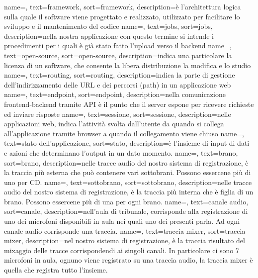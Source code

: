 {
  name=,
  text=framework,
  sort=framework,
  description={è l'architettura logica sulla quale il software viene progettato e realizzato, utilizzato per facilitare lo sviluppo e il mantenimento del codice}
}
{
  name=,
  text=jobs,
  sort=jobs,
  description={nella nostra applicazione con questo termine si intende i procedimenti per i quali è già stato fatto l'upload verso il backend}
}
{
  name=,
  text=open-source,
  sort=open-source,
  description={indica una particolare la licenza di un software, che consente la libera distribuzione la modifica e lo studio}
}
{
  name=,
  text=routing,
  sort=routing,
  description={indica la parte di gestione dell'indirizzamento delle URL e dei percorsi (path) in un applicazione web}
}
{
  name=,
  text=endpoint,
  sort=endpoint,
  description={nella comunicazione frontend-backend tramite API è il punto che il server espone per ricevere richieste ed inviare risposte}
}
{
  name=,
  text=sessione,
  sort=sessione,
  description={nelle applicazioni web, indica l'attività svolta dall'utente da quando si collega all'applicazione tramite browser a quando il collegamento viene chiuso}
}
{
  name=,
  text=stato dell'applicazione,
  sort=stato,
  description={è l'insieme di input di dati e azioni che determinano l'output in un dato momento.}
}
{
  name=,
  text=brano,
  sort=brano,
  description={nelle tracce audio del nostro sistema di registrazione, è la traccia più esterna che può contenere vari sottobrani. Possono essercene più di uno per CD.}
}
{
  name=,
  text=sottobrano,
  sort=sottobrano,
  description={nelle tracce audio del nostro sistema di registrazione, è la traccia più interna che è figlia di un brano. Possono essercene più di una per ogni brano.}
}
{
  name=,
  text=canale audio,
  sort=canale,
  description={nell'aula di tribunale, corrisponde alla registrazione di uno dei microfoni disponibili in aula nei quali uno dei presenti parla. Ad ogni canale audio corrisponde
      una traccia.}
}
{
  name=,
  text=traccia mixer,
  sort=traccia mixer,
  description={nel nostro sistema di registrazione, è la traccia risultato del mixaggio delle tracce corrispondendi ai singoli canali. In particolare ci sono 7 microfoni
      in aula, ognuno viene registrato su una traccia audio, la traccia mixer è quella che registra tutto l'insieme.}
}
